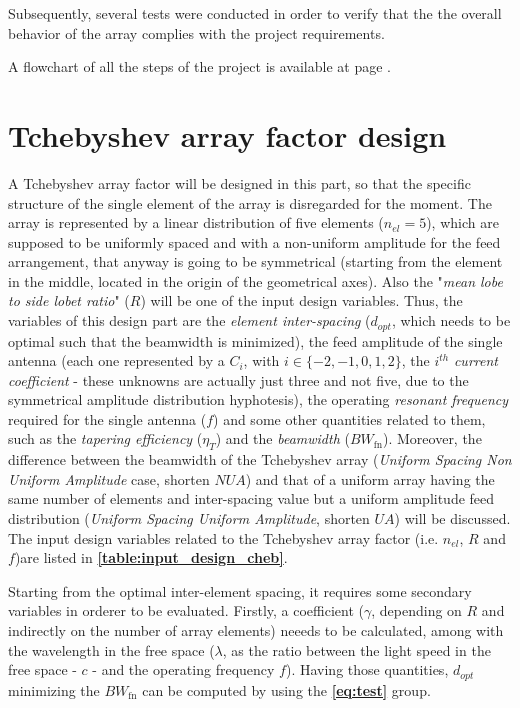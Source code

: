 \documentclass[10 pt,a4paper,twocolumn]{article}
\begin{document}
{Subsequently, several tests were conducted in order to verify that the the overall behavior of the array complies with the project requirements. 

A flowchart of all the steps of the project is available at page \pageref{fig:flowchart_2}.

	
\section*{Tchebyshev array factor design}

\indent A Tchebyshev array factor will be designed in this part, so that the specific structure of the single element of the array is disregarded for the moment. The array is represented by a linear distribution of five elements ($n_{el}=5$), which are supposed to be uniformly spaced and with a non-uniform amplitude for the feed arrangement, that anyway is going to be symmetrical (starting from the element in the middle, located in the origin of the geometrical axes). Also the "\emph{mean lobe to side lobet ratio}" ($R$) will be one of the input design variables. Thus, the variables of this design part are the \emph{element inter-spacing} ($d_{opt}$, which needs to be optimal such that the beamwidth is minimized), the feed amplitude of the single antenna (each one represented by a $C_i$, with $i\in\{-2,-1,0,1,2\}$, the $i^{th}$ \emph{current coefficient} - these unknowns are actually just three and not five, due to the symmetrical amplitude distribution hyphotesis), the operating \emph{resonant frequency} required for the single antenna ($f$) and some other quantities related to them, such as the \emph{tapering efficiency} ($\eta_T$) and the \emph{beamwidth} ($BW_{\operatorname{fn}}$). Moreover, the difference between the beamwidth of the Tchebyshev array (\emph{Uniform Spacing Non Uniform Amplitude} case, shorten $NUA$) and  that of a uniform array having the same number of elements and inter-spacing value but a uniform amplitude feed distribution  (\emph{Uniform Spacing Uniform Amplitude}, shorten $UA$) will be discussed. The input design variables related to the Tchebyshev array factor (i.e. $n_{el}$, $R$ and $f$)are listed in \textbf{\cref{table:input_design_cheb}}. 

\indent 

Starting from the optimal inter-element spacing, it requires some secondary variables in orderer to be evaluated. Firstly, a coefficient ($\gamma$, depending on $R$ and indirectly on the number of array elements) neeeds to be calculated, among with the wavelength in the free space ($\lambda$, as the ratio between the light speed in the free space - $c$ - and the operating frequency $f$). Having those quantities, $d_{opt}$ minimizing the $BW_{\operatorname{fn}}$ can be computed by using the \textbf{\cref{eq:test}} group. 




}
\end{document}

